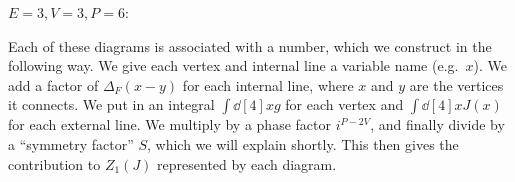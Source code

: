 \documentclass{jknotes} %
\begin{document}
\(E=3,V=3,P=6\):
\begin{figure}[H]
    \centering
\end{figure}

Each of these diagrams is associated with a number, which we construct in the following way. We give each vertex and internal line a variable name (e.g.\ \(x\)). We add a factor of \(\Delta_F(x-y)\) for each internal line, where \(x\) and \(y\) are the vertices it connects. We put in an integral \(\int\dd[4]{x}g\) for each vertex and \(\int\dd[4]{x}J(x)\) for each external line. We multiply by a phase factor \(i^{P-2V}\), and finally divide by a ``symmetry factor'' \(S\), which we will explain shortly. This then gives the contribution to \(Z_1(J)\) represented by each diagram.
\end{document}
